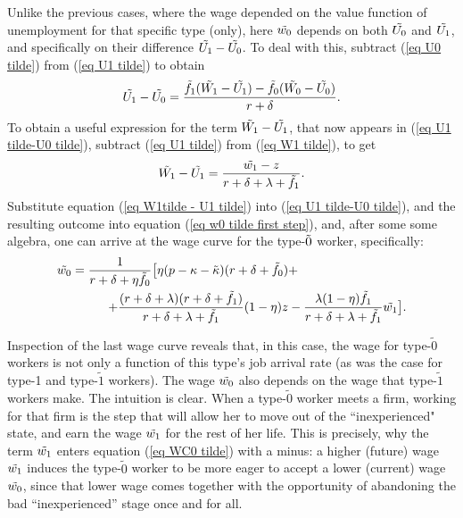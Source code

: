 \documentclass[12pt]{article} %
\theoremstyle{definition}
\begin{document}
Unlike the previous cases, where the wage depended on the value function of unemployment for that specific type (only), here $\Tilde{w_0}$ depends on both $\Tilde{U_0}$ {and} $\Tilde{U_1}$, and specifically on their difference $\Tilde{U_1}-\Tilde{U_0}$. To deal with this, subtract (\ref{eq U0 tilde}) from (\ref{eq U1 tilde}) to obtain 
\begin{equation}
\Tilde{U_1}-\Tilde{U_0} = \frac{\Tilde{f_1}(\Tilde{W_1}-\Tilde{U_1}) - \Tilde{f_0}(\Tilde{W_0}-\Tilde{U_0})}{r+\delta}.\label{eq U1 tilde-U0 tilde}
    \end{equation}To obtain a useful expression for the term $\Tilde{W_1}-\Tilde{U_1}$, that now appears in (\ref{eq U1 tilde-U0 tilde}), subtract (\ref{eq U1 tilde}) from (\ref{eq W1 tilde}), to get  
\begin{equation}
\Tilde{W_1}-\Tilde{U_1} = \frac{\Tilde{w_1}-z}{r+\delta+\lambda+\Tilde{f_1}}. \label{eq W1tilde - U1 tilde}
\end{equation} Substitute equation (\ref{eq W1tilde - U1 tilde}) into (\ref{eq U1 tilde-U0 tilde}), and the resulting outcome into equation (\ref{eq w0 tilde first step}), and, after some some algebra, one can arrive at the wage curve for the type-$\Tilde{0}$ worker, specifically: 
\begin{equation} 
\begin{split}
\Tilde{w_0} = \frac{1}{r+\delta+\eta \Tilde{f_0}}\big[\eta(p-\kappa-\Tilde{\kappa})(r+\delta+ \Tilde{f_0}) &+ \\
+\frac{(r+\delta+\lambda)(r+\delta+\Tilde{f_1})}{r+\delta+\lambda+\Tilde{f_1}}(1-\eta)z &- \frac{\lambda(1-\eta)\Tilde{f_1}}{r+\delta+\lambda+\Tilde{f_1}}\Tilde{w_1} \big]. \label{eq WC0 tilde}
\end{split}
\end{equation}

Inspection of the last wage curve reveals that, in this case, the wage for type-$\tilde{0}$ workers is not only a function of this type's job arrival rate (as was the case for type-1 and type-$\tilde{1}$ workers). The wage $\Tilde{w_0}$ also depends on the wage that type-$\tilde{1}$ workers make. The intuition is clear. When a type-$\tilde{0}$ worker meets a firm, working for that firm is the step that will allow her to move out of the ``inexperienced" state, and earn the wage $\Tilde{w_1}$ for the rest of her life. This is precisely, why the term $\Tilde{w_1}$ enters equation (\ref{eq WC0 tilde}) with a minus: a higher (future) wage $\Tilde{w_1}$ induces the type-$\tilde{0}$ worker to be more eager to accept a lower (current) wage $\Tilde{w_0}$, since that lower wage comes together with the opportunity of abandoning the bad ``inexperienced'' stage once and for all. 
\end{document}

